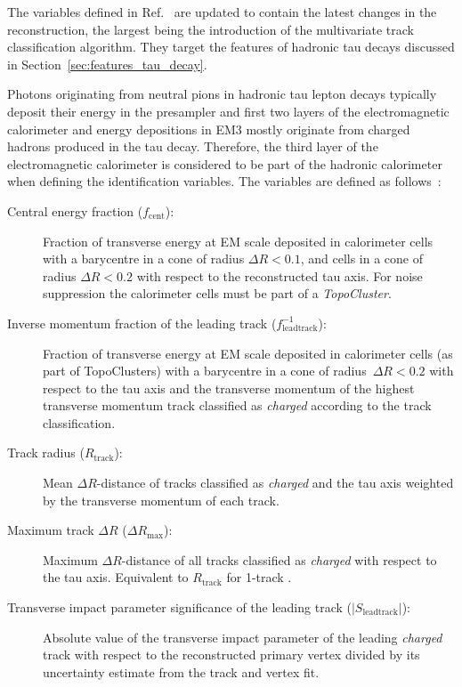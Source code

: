 The variables defined in Ref.~\cite{atlas:taurec:run2} are updated to contain
the latest changes in the reconstruction, the largest being the introduction of
the multivariate track classification algorithm. They target the features of
hadronic tau decays discussed in Section~\ref{sec:features_tau_decay}.

Photons originating from neutral pions in hadronic tau lepton decays typically
deposit their energy in the presampler and first two layers of the
electromagnetic calorimeter and energy depositions in EM3 mostly originate from
charged hadrons produced in the tau decay. Therefore, the third layer of the
electromagnetic calorimeter is considered to be part of the hadronic calorimeter
when defining the identification variables. The variables are defined as
follows~\cite{atlas:taurec:run2}:
\begin{description}
\item[Central energy fraction ($f_\text{cent}$):] Fraction of transverse energy
  at EM scale deposited in calorimeter cells with a barycentre in a cone of
  radius $\Delta R < 0.1$, and cells in a cone of radius $\Delta R < 0.2$ with
  respect to the reconstructed tau axis.
  For noise suppression the calorimeter cells must be part of a
  \emph{TopoCluster}.

\item[Inverse momentum fraction of the leading track
  ($f_\text{leadtrack}^{-1}$):] Fraction of transverse energy at EM scale
  deposited in calorimeter cells (as part of TopoClusters) with a
  barycentre in a cone of radius~$\Delta R < 0.2$ with respect to the tau axis
  and the transverse momentum of the highest transverse momentum track
  classified as \emph{charged} according to the track classification.

\item[Track radius ($R_\text{track}$):] Mean $\Delta R$-distance of tracks
  classified as \emph{charged} and the tau axis weighted by the transverse
  momentum of each track.

\item[Maximum track $\Delta R$ ($\Delta R_\text{max}$):] Maximum
  $\Delta R$-distance of all tracks classified as \emph{charged} with respect to
  the tau axis. Equivalent to $R_\text{track}$ for 1-track \tauhadvis.

\item[Transverse impact parameter significance of the leading track
  ($| S_\text{leadtrack} |$):] Absolute value of the transverse impact parameter
  of the leading \emph{charged} track with respect to the reconstructed primary
  vertex divided by its uncertainty estimate from the track and vertex fit.


\end{description}
